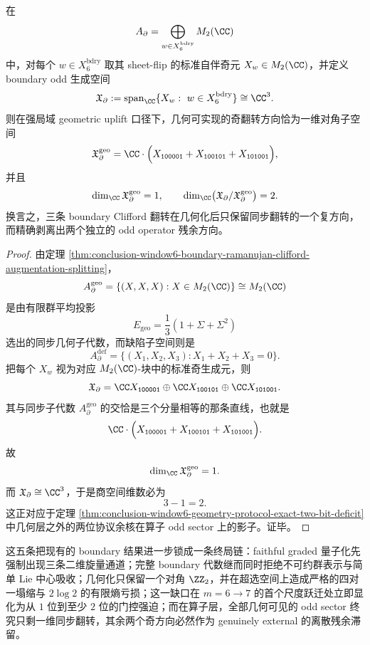 \begin{proposition}[几何可实现性的算子阴影仅剩一维同步翻转]\label{prop:conclusion-window6-geometric-odd-operator-shadow-onedim}
在
\[
A_{\partial}=\bigoplus_{w\in X_6^{\mathrm{bdry}}}M_2(\CC)
\]
中，对每个 \(w\in X_6^{\mathrm{bdry}}\) 取其 sheet-flip 的标准自伴奇元 \(X_w\in M_2(\CC)\)，并定义 boundary odd 生成空间
\[
\mathfrak X_{\partial}
:=
\operatorname{span}_{\CC}\{X_w:\ w\in X_6^{\mathrm{bdry}}\}
\cong \CC^3.
\]
则在强局域 geometric uplift 口径下，几何可实现的奇翻转方向恰为一维对角子空间
\[
\mathfrak X_{\partial}^{\mathrm{geo}}
=
\CC\cdot
\Bigl(
X_{\texttt{100001}}+
X_{\texttt{100101}}+
X_{\texttt{101001}}
\Bigr),
\]
并且
\[
\dim_{\CC}\mathfrak X_{\partial}^{\mathrm{geo}}=1,
\qquad
\dim_{\CC}\bigl(\mathfrak X_{\partial}/\mathfrak X_{\partial}^{\mathrm{geo}}\bigr)=2.
\]
换言之，三条 boundary Clifford 翻转在几何化后只保留同步翻转的一个复方向，而精确剥离出两个独立的 odd operator 残余方向。
\end{proposition}
\begin{proof}
由定理 \ref{thm:conclusion-window6-boundary-ramanujan-clifford-augmentation-splitting}，
\[
A_{\partial}^{\mathrm{geo}}
=
\{(X,X,X):X\in M_2(\CC)\}
\cong M_2(\CC)
\]
是由有限群平均投影
\[
E_{\mathrm{geo}}=\frac13(1+\Sigma+\Sigma^2)
\]
选出的同步几何子代数，而缺陷子空间则是
\[
A_{\partial}^{\mathrm{def}}
=
\{(X_1,X_2,X_3):X_1+X_2+X_3=0\}.
\]
把每个 \(X_w\) 视为对应 \(M_2(\CC)\)-块中的标准奇生成元，则
\[
\mathfrak X_{\partial}
=
\CC X_{\texttt{100001}}
\oplus
\CC X_{\texttt{100101}}
\oplus
\CC X_{\texttt{101001}}.
\]
其与同步子代数 \(A_{\partial}^{\mathrm{geo}}\) 的交恰是三个分量相等的那条直线，也就是
\[
\CC\cdot
\Bigl(
X_{\texttt{100001}}+
X_{\texttt{100101}}+
X_{\texttt{101001}}
\Bigr).
\]
故
\[
\dim_{\CC}\mathfrak X_{\partial}^{\mathrm{geo}}=1.
\]
而 \(\mathfrak X_{\partial}\cong \CC^3\)，于是商空间维数必为
\[
3-1=2.
\]
这正对应于定理 \ref{thm:conclusion-window6-geometry-protocol-exact-two-bit-deficit} 中几何层之外的两位协议余核在算子 odd sector 上的影子。证毕。
\end{proof}

\noindent
这五条把现有的 boundary 结果进一步锁成一条终局链：faithful graded 量子化先强制出现三条二维旋量通道；完整 boundary 代数继而同时拒绝不可约群表示与简单 Lie 中心吸收；几何化只保留一个对角 \(\ZZ_2\)，并在超选空间上造成严格的四对一塌缩与 \(2\log 2\) 的有限熵亏损；这一缺口在 \(m=6\to 7\) 的首个尺度跃迁处立即显化为从 \(1\) 位到至少 \(2\) 位的门控强迫；而在算子层，全部几何可见的 odd sector 终究只剩一维同步翻转，其余两个奇方向必然作为 genuinely external 的离散残余滞留。
